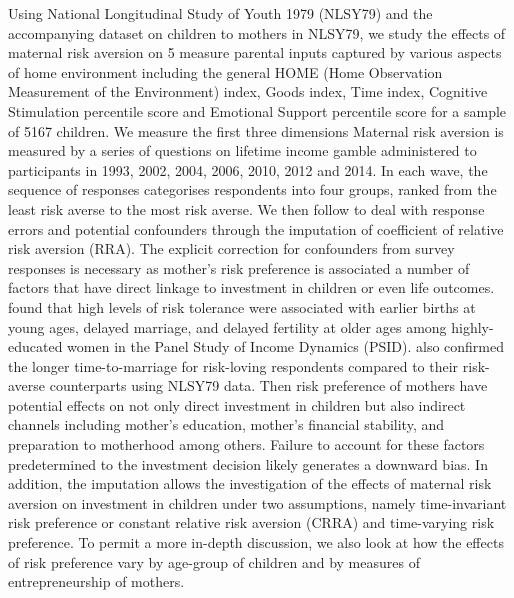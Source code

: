 \documentclass[emulatestandardclasses, 10pt, abstract = true]{scrartcl}
\begin{document}
Using National Longitudinal Study of Youth 1979 (NLSY79) and the accompanying dataset on children to mothers in NLSY79, we study the effects of maternal risk aversion on 5 measure parental inputs captured by various aspects of home environment including the general HOME (Home Observation Measurement of the Environment) index, Goods index, Time index, Cognitive Stimulation percentile score and Emotional Support percentile score for a sample of 5167 children. We measure the first three dimensions  Maternal risk aversion is measured by a series of questions on lifetime income gamble administered to participants in 1993, 2002, 2004, 2006, 2010, 2012 and 2014. In each wave, the sequence of responses categorises respondents into four groups, ranked from the least risk averse to the most risk averse. We then follow \citet{kimball2008imputing, kimball2009risk} to deal with response errors and potential confounders through the imputation of coefficient of relative risk aversion (RRA). The explicit correction for confounders from survey responses is necessary as mother's risk preference is associated a number of factors that have direct linkage to investment in children or even life outcomes. \citet{schmidt2008risk} found that high levels of risk tolerance were associated with earlier births at young ages, delayed marriage, and delayed fertility at older ages among highly-educated women in the Panel Study of Income Dynamics (PSID). \citet{spivey2010desperation} also confirmed the longer time-to-marriage for risk-loving respondents compared to their risk-averse counterparts using NLSY79 data. Then risk preference of mothers have potential effects on not only direct investment in children but also indirect channels including mother's education, mother's financial stability, and preparation to motherhood among others. Failure to account for these factors predetermined to the investment decision likely generates a downward bias. In addition, the imputation allows the investigation of the effects of maternal risk aversion on investment in children under two assumptions, namely time-invariant risk preference or constant relative risk aversion (CRRA) and time-varying risk preference. To permit a more in-depth discussion, we also look at how the effects of risk preference vary by age-group of children and by measures of entrepreneurship of mothers.
 
\end{document}
